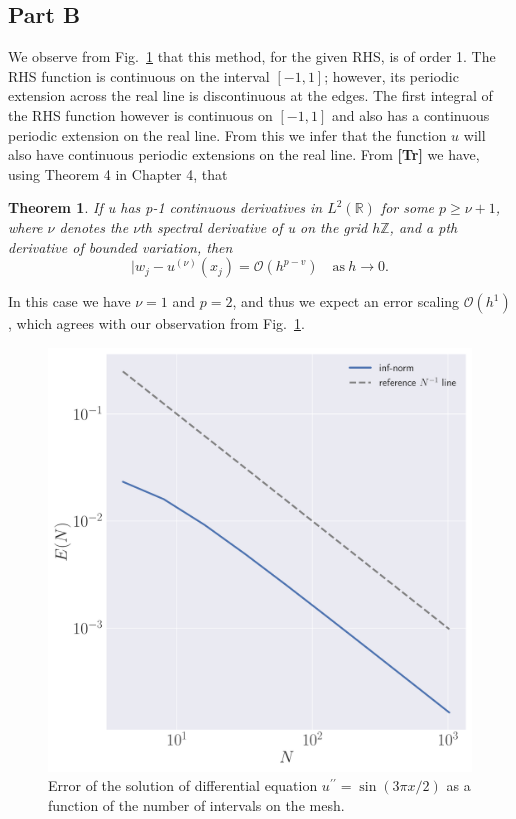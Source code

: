 \documentclass[12pt]{article}
\newcommand{\bO}{\mathcal{O}}
\newtheorem{theorem}{Theorem}
\begin{document}
\subsection*{Part B}

We observe from Fig.~\ref{fig:q1b} that this method, for the given RHS, is of order 1. The RHS function is continuous on the interval $[-1,1]$; however, its periodic extension across the real line is discontinuous at the edges. The first integral of the RHS function however is continuous on $[-1,1]$ and also has a continuous periodic extension on the real line. From this we infer that the function $u$ will also have continuous periodic extensions on the real line. From \textbf{[Tr]} we have, using Theorem 4 in Chapter 4, that 

\begin{theorem}
	If u has p-1 continuous derivatives in $L^{2}(\mathbb{R})$ for some $p\ge \nu + 1$, where $\nu$ denotes the $\nu$th spectral derivative of u on the grid $h\mathbb{Z}$, and a pth derivative of bounded variation, then $$|w_{j}-u^{(\nu)}(x_{j}) = \bO(h^{p-v})\quad \mathrm{as}\ h\to 0.$$
\end{theorem}

In this case we have $\nu = 1$ and $p=2$, and thus we expect an error scaling $\bO(h^{1})$, which agrees with our observation from Fig.~\ref{fig:q1b}.

\begin{figure}[!h]
    \centering
    \includegraphics[clip, scale=0.3]{q1b_fig.pdf}
    \caption{Error of the solution of differential equation $u^{\prime\prime} = \sin(3\pi x/2)$ as a function of the number of intervals on the mesh.}
    \label{fig:q1b}
\end{figure}
\end{document}
